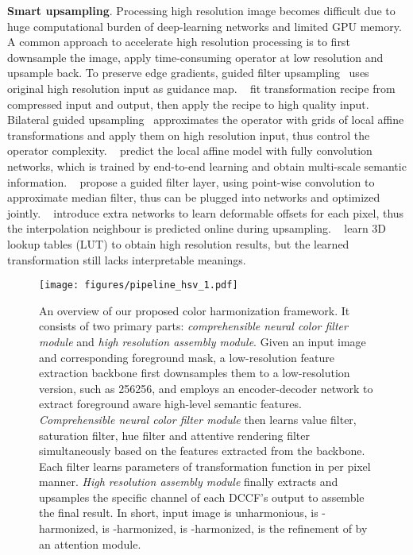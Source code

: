 \documentclass[runningheads]{llncs}
\begin{document}
    \noindent\textbf{Smart upsampling}. Processing high resolution image becomes difficult due to huge computational burden of deep-learning networks and limited GPU memory.
    A common approach to accelerate high resolution processing is to first downsample the image, apply time-consuming operator at low resolution and upsample back. To preserve edge gradients, guided filter upsampling~\cite{hekaiming2013GF} uses original high resolution input as guidance map. 
    ~\cite{gharbi2015transform} fit transformation recipe from compressed input and output, then apply the recipe to high quality input. Bilateral guided upsampling~\cite{chen2016bilateral} approximates the operator with grids of local affine transformations and apply them on high resolution input, thus control the operator complexity. 
    ~\cite{gharbi2017deep} predict the local affine model with fully convolution networks, which is trained by end-to-end learning and obtain multi-scale semantic information. 
    ~\cite{wu2018fast} propose a guided filter layer, using point-wise convolution to approximate median filter, thus can be plugged into networks and optimized jointly. 
    ~\cite{kim2019deformable} introduce extra networks to learn deformable offsets for each pixel, thus the interpolation neighbour is predicted online during upsampling. 
    ~\cite{CDTNet,zeng2020learning} learn 3D lookup tables (LUT) to obtain high resolution results, but the learned transformation still lacks interpretable meanings.


    


\begin{figure*}[h]
    \centering
    \texttt{[image: figures/pipeline\_hsv\_1.pdf]}
    \caption{
    An overview of our proposed color harmonization framework. It consists of two primary parts: \textit{comprehensible neural color filter module} and \textit{high resolution assembly module}.
    Given an input image and corresponding foreground mask, a low-resolution feature extraction backbone first downsamples them to a low-resolution version, such as 256256, and employs an encoder-decoder network to extract foreground aware high-level semantic features.
    \textit{Comprehensible neural color filter module} then learns value filter, saturation filter, hue filter and attentive rendering filter simultaneously based on the features extracted from the backbone.
    Each filter learns parameters of transformation function in per pixel manner.
\textit{High resolution assembly module} finally extracts and upsamples the specific channel of each DCCF's output to assemble the final result.
    In short, input image  is unharmonious,  is -harmonized,  is -harmonized,  is -harmonized,  is the refinement of  by an attention module.
    }
\label{fig:pipeline}
    \end{figure*}
    
\end{document}
